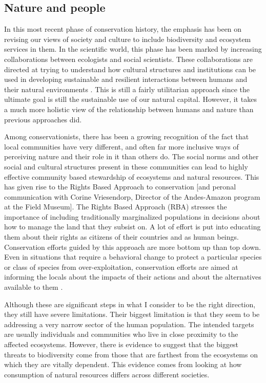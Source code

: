 \documentclass[rutwik_proposal.tex]{subfiles}
\begin{document}
\subsection{Nature and people}

In this most recent phase of conservation history, the emphasis has been on revising our views of society and culture to include biodiversity and ecosystem services in them. In the scientific world, this phase has been marked by increasing collaborations between ecologists and social scientists. These collaborations are directed at trying to understand how cultural structures and institutions can be used in developing sustainable and resilient interactions between humans and their natural environments \cite{Mace14, Ostrom10, Carpenter09}. This is still a fairly utilitarian approach since the ultimate goal is still the sustainable use of our natural capital. However, it takes a much more holistic view of the relationship between humans and nature than previous approaches did.

Among conservationists, there has been a growing recognition of the fact that local communities have very different, and often far more inclusive ways of perceiving nature and their role in it than others do. The social norms and other social and cultural structures present in these communities can lead to highly effective community based stewardship of ecosystems and natural resources. This has given rise to the Rights Based Approach to conservation \cite{Campese09} [and peronal communication with Corine Vriesendorp, Director of the Andes-Amazon program at the Field Museum]. The Rights Based Approach (RBA) stresses the importance of including traditionally marginalized populations in decisions about how to manage the land that they subsist on. A lot of effort is put into educating them about their rights as citizens of their countries and as human beings. Conservation efforts guided by this approach are more bottom up than top down. Even in situations that require a behavioral change to protect a particular species or class of species from over-exploitation, conservation efforts are aimed at informing the locals about the impacts of their actions and about the alternatives available to them \cite{Springer09}.

Although these are significant steps in what I consider to be the right direction, they still have severe limitations. Their biggest limitation is that they seem to be addressing a very narrow sector of the human population. The intended targets are usually individuals and communities who live in close proximity to the affected ecosystems. However, there is evidence to suggest that the biggest threats to biodiversity come from those that are farthest from the ecosystems on which they are vitally dependent. This evidence comes from looking at how consumption of natural resources differs across different societies.
\end{document}
